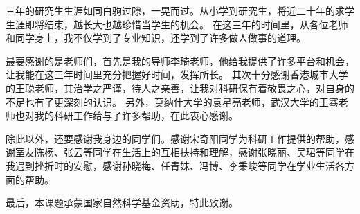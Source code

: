 \begin{acknowledgement}

  三年的研究生生涯如同白驹过隙，一晃而过。从小学到研究生，将近二十年的求学生涯即将结束，越长大也越珍惜当学生的机会。
  在这三年的时间里，从各位老师和同学身上，我不仅学到了专业知识，还学到了许多做人做事的道理。

  最要感谢的是老师们，首先是我的导师李琦老师，他给我提供了许多平台和机会，让我能在这三年时间里充分把握好时间，发挥所长。
  其次十分感谢香港城市大学的王聪老师，其治学之严谨，待人之亲善，让我对科研保有着敬畏之心，对自身的不足也有了更深刻的认识。
  另外，莫纳什大学的袁星亮老师，武汉大学的王骞老师也对我的科研工作给与了许多帮助，在此衷心感谢。

  除此以外，还要感谢我身边的同学们。感谢宋奇阳同学为科研工作提供的帮助，感谢室友陈杨、张云等同学在生活上的互相扶持和理解，感谢张晓丽、吴珺等同学在我遇到挫折时的安慰，感谢孙晓梅、任青妹、冯博、李秉峻等同学在学业生活各方面的帮助。

  最后，本课题承蒙国家自然科学基金资助，特此致谢。

\end{acknowledgement}

